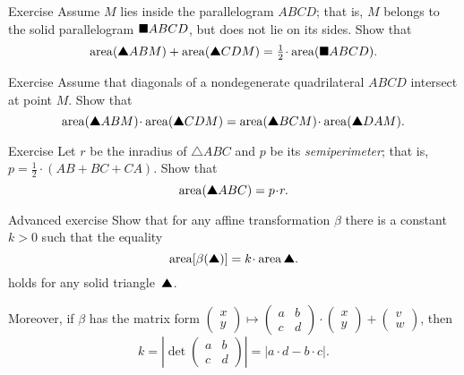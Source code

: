\begin{thm}{Exercise}\label{ex:half-parallelogram}
Assume $M$ lies inside the parallelogram $ABCD$;
that is, $M$ belongs to the solid parallelogram $\blacksquare ABCD$, but does not lie on its sides.
Show that
\[\area(\solidtriangle ABM)+\area(\solidtriangle CDM)
=\tfrac12\cdot \area(\solidsquare ABCD).\]
\end{thm}


\begin{thm}{Exercise}\label{ex:area-diag}
Assume that diagonals 
of a nondegenerate quadrilateral $ABCD$ 
intersect at point $M$.
Show that 
\[\area(\solidtriangle ABM)\cdot\area(\solidtriangle CDM)
=
\area(\solidtriangle BCM)\cdot\area(\solidtriangle DAM).\]
 
\end{thm}

\begin{thm}{Exercise}\label{ex:area-inradius}
Let $r$ be the inradius of $\triangle ABC$
and $p$ be its {}\emph{semiperimeter}; 
that is, $p=\tfrac12\cdot(AB+BC+CA)$.
Show that
\[\area(\solidtriangle ABC)=p\cdot r.\]

\end{thm}

\begin{thm}{Advanced exercise}\label{ex:area-affine}
Show that for any affine transformation $\beta$ there is a constant $k>0$
such that the equality 
\[\area[\beta(\solidtriangle)]=k\cdot\area\solidtriangle.\]
holds for any solid triangle~$\solidtriangle$.

Moreover, if $\beta$ has the matrix form $\left(\begin{smallmatrix}
x\\ y
\end{smallmatrix} \right)
  \mapsto
  \left(\begin{smallmatrix}
a&b\\ c&d
\end{smallmatrix} \right)
  \cdot
  \left(\begin{smallmatrix}
x\\ y
\end{smallmatrix} \right)
  +
\left(\begin{smallmatrix}
v\\ w
\end{smallmatrix} \right)$,
then 
\[k=|\det\left(\begin{smallmatrix}
a&b\\ c&d
\end{smallmatrix} \right)|=|a\cdot d-b\cdot c|.\]

\end{thm}





